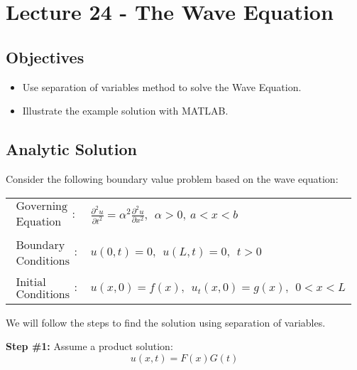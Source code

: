 \chapter{Lecture 24 - The Wave Equation}
\label{ch:lec24}
\section{Objectives}
\begin{itemize}
\item Use separation of variables method to solve the Wave Equation.
\item Illustrate the example solution with MATLAB.
\end{itemize}
\setcounter{lstannotation}{0} %

\section{Analytic Solution}
Consider the following boundary value problem based on the wave equation:
\begin{table}
\begin{tabular}{l l}
$\substack{\text{Governing} \\\text{Equation}}: $& $\frac{\partial^2 u}{\partial t^2} = \alpha^2 \frac{\partial^2 u}{\partial x^2}, \ \ \alpha > 0, \ a<x<b$  \\
& \\
$\substack{\text{Boundary} \\ \text{Conditions}}: $& $u(0,t)=0, \ \ u(L,t) = 0, \ \ t>0$\\
& \\
$\substack{\text{Initial} \\ \text{Conditions}}: $ & $u(x,0) = f(x), \ \ u_{t}(x,0) = g(x), \ \ 0<x<L $ \\
\end{tabular}
\end{table}

\vspace{0.25cm}

\noindent We will follow the steps to find the solution using separation of variables.

\vspace{0.5cm}

\noindent\textbf{Step \#1:} Assume a product solution:
\begin{equation*}
u(x,t) = F(x)G(t)
\end{equation*}

